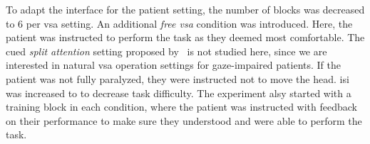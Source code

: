 To adapt the interface for the patient setting, the number of blocks was
decreased to 6 per \ac{vsa} setting.
An additional \emph{free \ac{vsa}} condition was introduced.
Here, the patient was instructed to perform the task as they deemed most
comfortable.
The cued \emph{split attention} setting proposed
by~\textcite{VanDenKerchove2024} is not studied here, since we are interested
in natural \ac{vsa} operation settings for gaze-impaired patients.
If the patient was not fully paralyzed, they were instructed not to move the head.
\Ac{isi} was increased to to decrease task difficulty.
The experiment alsy started with a training block in each condition, where the
patient was instructed with feedback on their performance to make sure they
understood and were able to perform the task.

